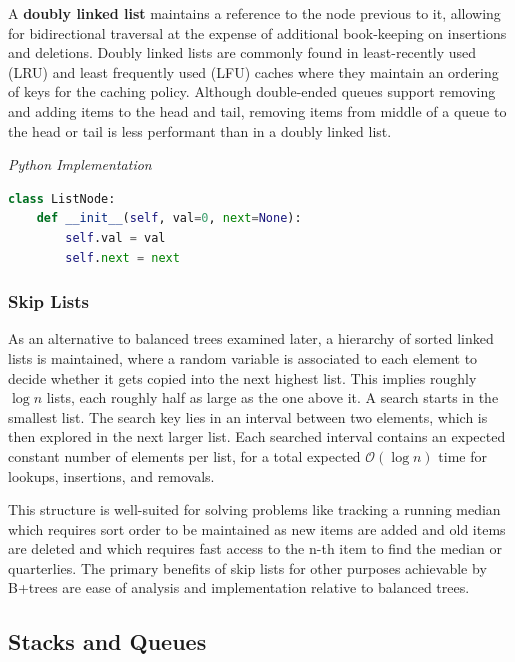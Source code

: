 \documentclass{article}
\newcommand{\bigO}{\mathcal{O}}
\begin{document}
    A \textbf{doubly linked list} maintains a reference to the node previous to it, allowing for bidirectional traversal at the expense of additional book-keeping on insertions and deletions. Doubly linked lists are commonly found in least-recently used (LRU) and least frequently used (LFU) caches where they maintain an ordering of keys for the caching policy. Although double-ended queues support removing and adding items to the head and tail, removing items from middle of a queue to the head or tail is less performant than in a doubly linked list.
    
\vspace{8pt} \emph{Python Implementation}
\begin{lstlisting}[language=Python]
class ListNode:
    def __init__(self, val=0, next=None):
        self.val = val
        self.next = next
\end{lstlisting}
        
    \subsubsection{Skip Lists}
    As an alternative to balanced trees examined later, a hierarchy of sorted linked lists is maintained, where a random variable is associated to each element to decide whether it gets copied into the next highest list. This implies roughly $\log n$ lists, each roughly half as large as the one above it. A search starts in the smallest list. The search key lies in an interval between two elements, which is then explored in the next larger list. Each searched interval contains an expected constant number of elements per list, for a total expected $\bigO(\log n)$ time for lookups, insertions, and removals. 
    
    This structure is well-suited for solving problems like tracking a running median which requires sort order to be maintained as new items are added and old items are deleted and which requires fast access to the n-th item to find the median or quarterlies. The primary benefits of skip lists for other purposes achievable by B+trees are ease of analysis and implementation relative to balanced trees.
    
    \subsection{Stacks and Queues}
\end{document}
